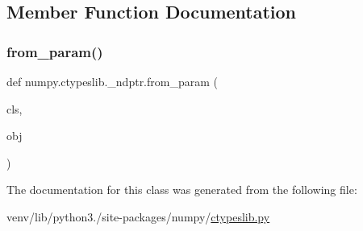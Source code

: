 \subsection{Member Function Documentation}
\mbox{\label{classnumpy_1_1ctypeslib_1_1__ndptr_a2436b4c9fdafa035133cc4c471467251}} 
\subsubsection{\texorpdfstring{from\+\_\+param()}{from\_param()}}
{\footnotesize\ttfamily def numpy.\+ctypeslib.\+\_\+ndptr.\+from\+\_\+param (\begin{DoxyParamCaption}\item[{}]{cls,  }\item[{}]{obj }\end{DoxyParamCaption})}



The documentation for this class was generated from the following file\+:\begin{DoxyCompactItemize}
\item 
venv/lib/python3./site-\/packages/numpy/\hyperlink{ctypeslib_8py}{ctypeslib.\+py}\end{DoxyCompactItemize}
